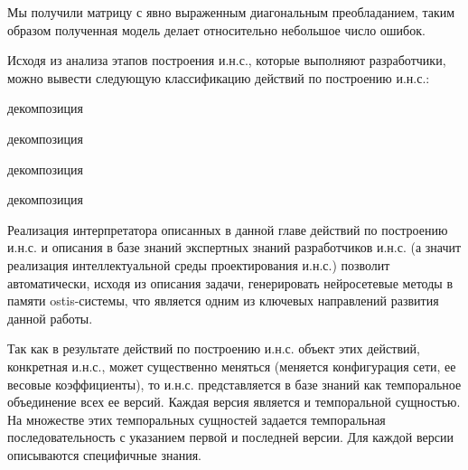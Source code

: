 Мы получили матрицу с явно выраженным диагональным преобладанием, таким образом полученная модель делает относительно небольшое число ошибок.

Исходя из анализа этапов построения и.н.с., которые выполняют разработчики, можно вывести следующую классификацию действий по построению и.н.с.:

\begin{SCn}
	\begin{scnrelfromset}{декомпозиция}
		\begin{scnrelfromset}{декомпозиция}
		\end{scnrelfromset}

		\begin{scnrelfromset}{декомпозиция}
		\end{scnrelfromset}

		\begin{scnrelfromset}{декомпозиция}
		\end{scnrelfromset}
	\end{scnrelfromset}
\end{SCn}

Реализация интерпретатора описанных в данной главе действий по построению и.н.с. и описания в базе знаний экспертных знаний разработчиков и.н.с. (а значит реализация интеллектуальной среды проектирования и.н.с.) позволит автоматически, исходя из описания задачи, генерировать нейросетевые методы в памяти ostis-системы, что является одним из ключевых направлений развития данной работы.

Так как в результате действий по построению и.н.с. объект этих действий, конкретная и.н.с., может существенно меняться (меняется конфигурация сети, ее весовые коэффициенты), то и.н.с. представляется в базе знаний как темпоральное объединение всех ее версий. Каждая версия является   и темпоральной сущностью. На множестве этих темпоральных сущностей задается темпоральная последовательность с указанием первой и последней версии. Для каждой версии описываются специфичные знания.

